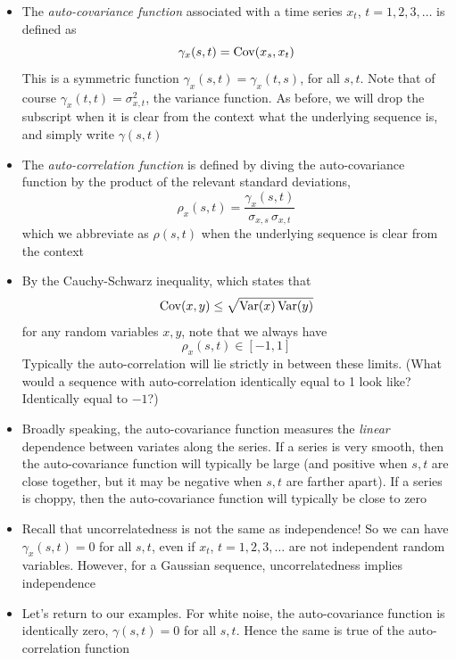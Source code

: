 \documentclass{article}
\begin{document}
\begin{itemize}
\item The \emph{auto-covariance function} associated with a time series $x_t$,
  $t = 1,2,3,\dots$ is defined as
  \[
  \gamma_x(s,t) = \operatorname{Cov}(x_s, x_t)
  \]
  This is a symmetric function $\gamma_x(s,t) = \gamma_x(t,s)$, for all $s,t$.
  Note that of course $\gamma_x(t,t) = \sigma^2_{x,t}$, the variance
  function. As before, we will drop the subscript when it is clear from the
  context what the underlying sequence is, and simply write $\gamma(s,t)$  

\item The \emph{auto-correlation function} is defined by diving the
  auto-covariance function by the product of the relevant standard deviations, 
  \[
  \rho_x(s,t) = \frac{\gamma_x(s,t)}{\sigma_{x,s} \, \sigma_{x,t}}
  \]
  which we abbreviate as $\rho(s,t)$ when the underlying sequence is clear from
  the context 

\item By the Cauchy-Schwarz inequality, which states that
  \[
  \operatorname{Cov}(x, y) \leq \sqrt{\operatorname{Var}(x) \operatorname{Var}(y)}
  \]
  for any random variables $x,y$, note that we always have
  \[
  \rho_x(s,t) \in [-1, 1]
  \]
  Typically the auto-correlation will lie strictly in between these limits. 
  (What would a sequence with auto-correlation identically equal to 1 look like?  
  Identically equal to $-1$?) 

\item Broadly speaking, the auto-covariance function measures the \emph{linear}
  dependence between variates along the series. If a series is very smooth, then
  the auto-covariance function will typically be large (and positive when $s,t$
  are close together, but it may be negative when $s,t$ are farther apart). If a 
  series is choppy, then the auto-covariance function will typically be close to
  zero 

\item Recall that uncorrelatedness is not the same as independence! So we can
  have $\gamma_x(s,t) = 0$ for all $s,t$, even if $x_t$, $t = 1,2,3,\dots$ are
  not independent random variables. However, for a Gaussian sequence,
  uncorrelatedness implies independence

\item Let's return to our examples. For white noise, the auto-covariance
  function is identically zero, $\gamma(s,t) = 0$ for all $s,t$. Hence the same
  is true of the auto-correlation function


\end{itemize}
\end{document}
